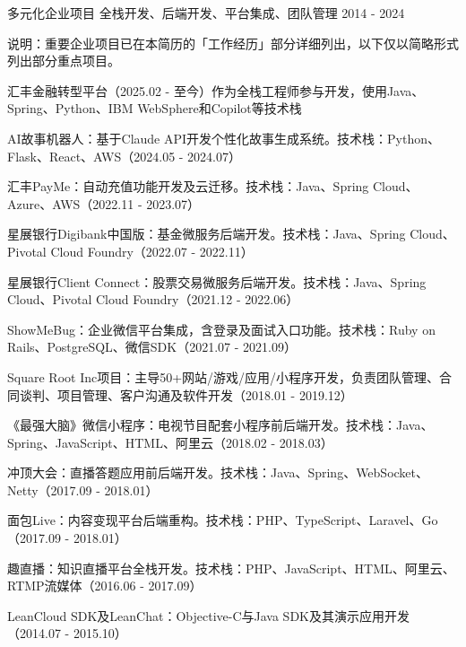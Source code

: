 
\begin{cventries}

  \cventry
    {多元化企业项目} %
    {全栈开发、后端开发、平台集成、团队管理} %
    {} %
    {2014 - 2024} %
    {
      \begin{cvitems} %
        \item {说明：重要企业项目已在本简历的「工作经历」部分详细列出，以下仅以简略形式列出部分重点项目。}
        \item {汇丰金融转型平台（2025.02 - 至今）作为全栈工程师参与开发，使用Java、Spring、Python、IBM WebSphere和Copilot等技术栈}
        \item {AI故事机器人：基于Claude API开发个性化故事生成系统。技术栈：Python、Flask、React、AWS（2024.05 - 2024.07）}
        \item {汇丰PayMe：自动充值功能开发及云迁移。技术栈：Java、Spring Cloud、Azure、AWS（2022.11 - 2023.07）}
        \item {星展银行Digibank中国版：基金微服务后端开发。技术栈：Java、Spring Cloud、Pivotal Cloud Foundry（2022.07 - 2022.11）}
        \item {星展银行Client Connect：股票交易微服务后端开发。技术栈：Java、Spring Cloud、Pivotal Cloud Foundry（2021.12 - 2022.06）}
        \item {ShowMeBug：企业微信平台集成，含登录及面试入口功能。技术栈：Ruby on Rails、PostgreSQL、微信SDK（2021.07 - 2021.09）}
        \item {Square Root Inc项目：主导50+网站/游戏/应用/小程序开发，负责团队管理、合同谈判、项目管理、客户沟通及软件开发（2018.01 - 2019.12）}
        \item {《最强大脑》微信小程序：电视节目配套小程序前后端开发。技术栈：Java、Spring、JavaScript、HTML、阿里云（2018.02 - 2018.03）}
        \item {冲顶大会：直播答题应用前后端开发。技术栈：Java、Spring、WebSocket、Netty（2017.09 - 2018.01）}
        \item {面包Live：内容变现平台后端重构。技术栈：PHP、TypeScript、Laravel、Go（2017.09 - 2018.01）}
        \item {趣直播：知识直播平台全栈开发。技术栈：PHP、JavaScript、HTML、阿里云、RTMP流媒体（2016.06 - 2017.09）}
        \item {LeanCloud SDK及LeanChat：Objective-C与Java SDK及其演示应用开发（2014.07 - 2015.10）}
      \end{cvitems}
    }

\end{cventries}
